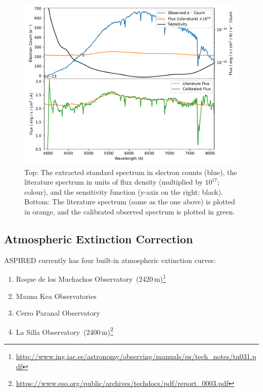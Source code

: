 \documentclass[fleqn,usenatbib]{mnras}
\begin{document}
\begin{figure}
    \centering
    \includegraphics[width=\columnwidth]{fig_06_flux_calibration_diagnostics.pdf}
    \caption{Top: The extracted standard spectrum in electron counts
    (blue), the literature spectrum in units of flux density (multiplied
    by $10^{17}$; colour), and the sensitivity function (y-axis on the right; black).
    Bottom: The literature spectrum (same as the one above) is plotted
    in orange, and the calibrated observed spectrum is plotted in green.}
    \label{fig:fluxcal}
\end{figure}

\subsection{Atmospheric Extinction Correction}
\textsc{ASPIRED} currently has four built-in atmospheric extinction curves:

\begin{enumerate}
    \item Roque de los Muchachos Observatory~(2420\,m)\footnote{\url{http://www.ing.iac.es/astronomy/observing/manuals/ps/tech\_notes/tn031.pdf}}
    \item Mauna Kea Observatories~\citep[4205\,m;][]{2013A&A...549A...8B}
    \item Cerro Paranal Observatory~\citep[2635\,m;][]{2011A&A...527A..91P}
    \item La Silla Observatory~(2400\,m)\footnote{\url{https://www.eso.org/public/archives/techdocs/pdf/report\_0003.pdf}}
\end{enumerate}
\end{document}
